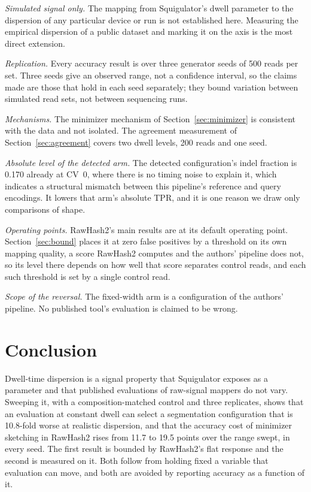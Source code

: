 \documentclass[11pt,a4paper]{article}
\begin{document}
\textit{Simulated signal only.} The mapping from Squigulator's dwell parameter to the dispersion of
any particular device or run is not established here. Measuring the empirical dispersion of a
public dataset and marking it on the axis is the most direct extension.

\textit{Replication.} Every accuracy result is over three generator seeds of 500 reads per set.
Three seeds give an observed range, not a confidence interval, so the claims made are those that
hold in each seed separately; they bound variation between simulated read sets, not between
sequencing runs.

\textit{Mechanisms.} The minimizer mechanism of Section~\ref{sec:minimizer} is consistent with the
data and not isolated. The agreement measurement of Section~\ref{sec:agreement} covers two dwell
levels, 200 reads and one seed.

\textit{Absolute level of the detected arm.} The detected configuration's indel fraction is 0.170
already at CV~0, where there is no timing noise to explain it, which indicates a structural
mismatch between this pipeline's reference and query encodings. It lowers that arm's absolute TPR,
and it is one reason we draw only comparisons of shape.

\textit{Operating points.} RawHash2's main results are at its default operating point.
Section~\ref{sec:bound} places it at zero false positives by a threshold on its own mapping quality,
a score RawHash2 computes and the authors' pipeline does not, so its level there depends on how well
that score separates control reads, and each such threshold is set by a single control read.

\textit{Scope of the reversal.} The fixed-width arm is a configuration of the authors' pipeline. No
published tool's evaluation is claimed to be wrong.

\section{Conclusion}\label{sec:conclusion}

Dwell-time dispersion is a signal property that Squigulator exposes as a parameter and that
published evaluations of raw-signal mappers do not vary. Sweeping it, with a composition-matched
control and three replicates, shows that an evaluation at constant dwell can select a segmentation
configuration that is 10.8-fold worse at realistic dispersion, and that the accuracy cost of
minimizer sketching in RawHash2 rises from 11.7 to 19.5 points over the range swept, in every seed. The first
result is bounded by RawHash2's flat response and the second is measured on it. Both follow from
holding fixed a variable that evaluation can move, and both are avoided by reporting accuracy as a
function of it.
\end{document}
